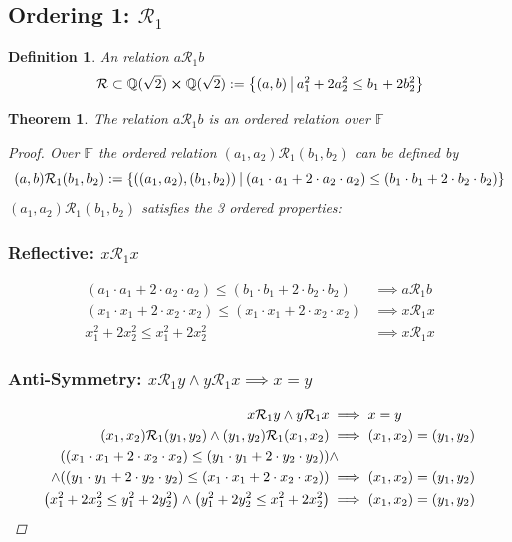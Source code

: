 \documentclass[]{article}
\newcommand{\Rel}{\mathcal{R}}
\newcommand{\Q}{\mathbb{Q}}
\newcommand{\st}{ \ \vline \ }
\newtheorem{definition}{Definition}
\newtheorem{theorem}{Theorem}
\begin{document}
\subsection{Ordering 1: $\Rel_1$}
\begin{definition}
    An relation $a \Rel_1 b$ %
    $$\Rel \subset \Q(\sqrt{2}) \cross \Q(\sqrt{2}) 
        := \qty{(a,b) \st a_1^2 + 2 a_2^2 \leq b_1 + 2 b_2^2}$$
\end{definition}
\begin{theorem}
    The relation $a \Rel_1 b$ is an ordered relation over $\mathbb{F}$
    \begin{proof}
        Over $\mathbb{F}$ the ordered relation $(a_1,a_2) \Rel_1 (b_1,b_2)$ can be defined by 
        $$(a, b) \Rel_1 (b_1,b_2) 
            := \qty{((a_1,a_2),(b_1,b_2)) \st (a_1 \cdot a_1 + 2 \cdot a_2 \cdot a_2) 
                \leq (b_1 \cdot b_1 + 2 \cdot b_2 \cdot b_2)}
        $$
        $(a_1, a_2) \Rel_1 (b_1,b_2)$ satisfies the 3 ordered properties:
        \subsubsection{Reflective: $x \Rel_1 x$}
        \begin{align*}
            (a_1 \cdot a_1 + 2 \cdot a_2 \cdot a_2) 
                \leq (b_1 \cdot b_1 + 2 \cdot b_2 \cdot b_2)
                &\implies a \Rel_1 b\\
            (x_1 \cdot x_1 + 2 \cdot x_2 \cdot x_2) 
                \leq (x_1 \cdot x_1 + 2 \cdot x_2 \cdot x_2)
                &\implies x \Rel_1 x\\
            x_1^2 + 2 x_2^2 \leq x_1^2 + 2 x_2^2 &\implies x \Rel_1 x
        \end{align*}
        
        \subsubsection{Anti-Symmetry: $x \Rel_1 y \land y \Rel_1 x \implies x = y$}
        \begin{align*}
            x \Rel_1 y \land y \Rel_1 x &\implies x = y\\
            (x_1,x_2) \Rel_1 (y_1,y_2) \land (y_1,y_2) \Rel_1 (x_1,x_2) 
                &\implies (x_1,x_2)=(y_1,y_2)\\
            \qty((x_1 \cdot x_1 + 2 \cdot x_2 \cdot x_2)
                    \leq (y_1 \cdot y_1 + 2 \cdot y_2 \cdot y_2))
            &\land\\
                \land \qty((y_1 \cdot y_1 + 2 \cdot y_2 \cdot y_2)
                    \leq (x_1 \cdot x_1 + 2 \cdot x_2 \cdot x_2))
                &\implies (x_1,x_2) = (y_1,y_2)\\
            \qty(x_1^2 + 2 x_2^2 \leq y_1^2 + 2 y_2^2)
                \land \qty(y_1^2 + 2 y_2^2 \leq x_1^2 + 2 x_2^2)
                &\implies (x_1,x_2) = (y_1,y_2)\\
        \end{align*}
        

\end{proof}
\end{theorem}
\end{document}
